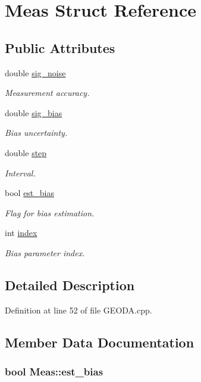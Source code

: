 \hypertarget{structMeas}{\section{Meas Struct Reference}
\label{structMeas}
}
\subsection*{Public Attributes}
\begin{DoxyCompactItemize}
\item 
double \hyperlink{structMeas_a16daa8cf217c6d2a09b63725c9e9f1b4}{sig\-\_\-noise}
\begin{DoxyCompactList}\small\item\em Measurement accuracy. \end{DoxyCompactList}\item 
double \hyperlink{structMeas_a754e86a093393d785b30f9d1cdcbef4c}{sig\-\_\-bias}
\begin{DoxyCompactList}\small\item\em Bias uncertainty. \end{DoxyCompactList}\item 
double \hyperlink{structMeas_ab350e1dba80e64fe121f5bbed646a05c}{step}
\begin{DoxyCompactList}\small\item\em Interval. \end{DoxyCompactList}\item 
bool \hyperlink{structMeas_a7ac048b880926ca2301b4616b8f86c8f}{est\-\_\-bias}
\begin{DoxyCompactList}\small\item\em Flag for bias estimation. \end{DoxyCompactList}\item 
int \hyperlink{structMeas_a7a3aa7407c590962408fb450a57386e4}{index}
\begin{DoxyCompactList}\small\item\em Bias parameter index. \end{DoxyCompactList}\end{DoxyCompactItemize}


\subsection{Detailed Description}


Definition at line 52 of file G\-E\-O\-D\-A.\-cpp.



\subsection{Member Data Documentation}
\hypertarget{structMeas_a7ac048b880926ca2301b4616b8f86c8f}{
\subsubsection[{est\-\_\-bias}]{\setlength{\rightskip}{0pt plus 5cm}bool Meas\-::est\-\_\-bias}}\label{structMeas_a7ac048b880926ca2301b4616b8f86c8f}


